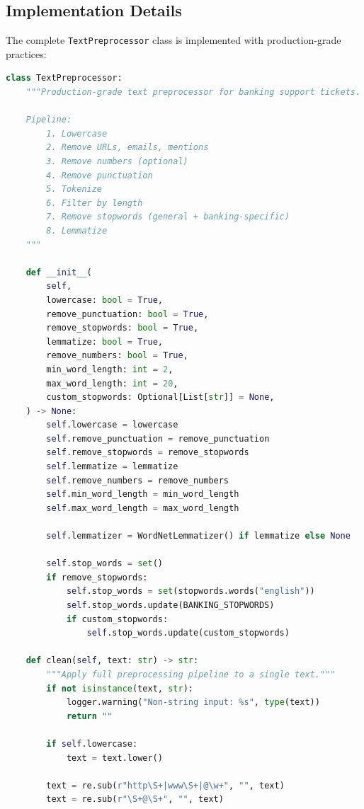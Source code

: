 \documentclass[12pt,a4paper]{article}
\begin{document}
\subsection{Implementation Details}
\label{subsec:preproc-impl}

The complete \texttt{TextPreprocessor} class is implemented with production-grade practices:

\begin{lstlisting}[language=Python, caption={TextPreprocessor class implementation (\texttt{src/data/preprocessing.py})}]
class TextPreprocessor:
    """Production-grade text preprocessor for banking support tickets.

    Pipeline:
        1. Lowercase
        2. Remove URLs, emails, mentions
        3. Remove numbers (optional)
        4. Remove punctuation
        5. Tokenize
        6. Filter by length
        7. Remove stopwords (general + banking-specific)
        8. Lemmatize
    """

    def __init__(
        self,
        lowercase: bool = True,
        remove_punctuation: bool = True,
        remove_stopwords: bool = True,
        lemmatize: bool = True,
        remove_numbers: bool = True,
        min_word_length: int = 2,
        max_word_length: int = 20,
        custom_stopwords: Optional[List[str]] = None,
    ) -> None:
        self.lowercase = lowercase
        self.remove_punctuation = remove_punctuation
        self.remove_stopwords = remove_stopwords
        self.lemmatize = lemmatize
        self.remove_numbers = remove_numbers
        self.min_word_length = min_word_length
        self.max_word_length = max_word_length

        self.lemmatizer = WordNetLemmatizer() if lemmatize else None

        self.stop_words = set()
        if remove_stopwords:
            self.stop_words = set(stopwords.words("english"))
            self.stop_words.update(BANKING_STOPWORDS)
            if custom_stopwords:
                self.stop_words.update(custom_stopwords)

    def clean(self, text: str) -> str:
        """Apply full preprocessing pipeline to a single text."""
        if not isinstance(text, str):
            logger.warning("Non-string input: %s", type(text))
            return ""

        if self.lowercase:
            text = text.lower()

        text = re.sub(r"http\S+|www\S+|@\w+", "", text)
        text = re.sub(r"\S+@\S+", "", text)


\end{lstlisting}
\end{document}
